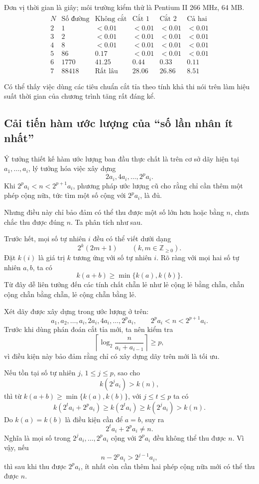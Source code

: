 \documentclass[11pt]{article}
\begin{document}
Đơn vị thời gian là giây; môi trường kiểm thử là Pentium II 266 MHz, 64 MB.
\[
\begin{array}{c|r|c|c|c|c}
N & \text{Số đường} & \text{Không cắt} & \text{Cắt 1} &
\text{Cắt 2} & \text{Cả hai}\\
\hline
2 & 1 & <0.01 & <0.01 & <0.01 & <0.01\\
3 & 2 & <0.01 & <0.01 & <0.01 & <0.01\\
4 & 8 & <0.01 & <0.01 & <0.01 & <0.01\\
5 & 86 & 0.17 & <0.01 & <0.01 & <0.01\\
6 & 1770 & 41.25 & 0.44 & 0.33 & 0.11\\
7 & 88418 & \text{Rất lâu} & 28.06 & 26.86 & 8.51
\end{array}
\]

Có thể thấy việc dùng các tiêu chuẩn cắt tỉa theo tính khả thi nói trên làm
hiệu suất thời gian của chương trình tăng rất đáng kể.

\subsection{Cải tiến hàm ước lượng của ``số lần nhân ít nhất''}

Ý tưởng thiết kế hàm ước lượng ban đầu thực chất là trên cơ sở dãy hiện tại
\(a_1,\ldots,a_i\), lý tưởng hóa việc xây dựng
\[
  2a_i,4a_i,\ldots,2^p a_i.
\]
Khi \(2^p a_i<n<2^{p+1}a_i\), phương pháp ước lượng cũ cho rằng chỉ cần thêm
một phép cộng nữa, tức tìm một số cộng với \(2^p a_i\), là đủ.

Nhưng điều này chỉ bảo đảm có thể thu được một số lớn hơn hoặc bằng \(n\),
chưa chắc thu được đúng \(n\). Ta phân tích như sau.

Trước hết, mọi số tự nhiên \(i\) đều có thể viết dưới dạng
\[
  2^k(2m+1)\qquad (k,m\in\mathbb{Z}_{\ge 0}).
\]
Đặt \(k(i)\) là giá trị \(k\) tương ứng với số tự nhiên \(i\). Rõ ràng với mọi
hai số tự nhiên \(a,b\), ta có
\[
  k(a+b)\ge \min\{k(a),k(b)\}.
\]
Từ đây dễ liên tưởng đến các tính chất chẵn lẻ như lẻ cộng lẻ bằng chẵn, chẵn
cộng chẵn bằng chẵn, lẻ cộng chẵn bằng lẻ.

Xét dãy được xây dựng trong ước lượng ở trên:
\[
  a_1,a_2,\ldots,a_i,2a_i,4a_i,\ldots,2^p a_i,
  \qquad 2^p a_i<n<2^{p+1}a_i.
\]
Trước khi dùng phán đoán cắt tỉa mới, ta nên kiểm tra
\[
  \left\lceil \log_2\frac{n}{a_i+a_{i-1}}\right\rceil \ge p,
\]
vì điều kiện này bảo đảm rằng chỉ có xây dựng dãy trên mới là tối ưu.

Nếu tồn tại số tự nhiên \(j\), \(1\le j\le p\), sao cho
\[
  k(2^j a_i)>k(n),
\]
thì từ \(k(a+b)\ge\min\{k(a),k(b)\}\), với \(j\le t\le p\) ta có
\[
  k(2^t a_i+2^p a_i)\ge k(2^t a_i)\ge k(2^j a_i)>k(n).
\]
Do \(k(a)=k(b)\) là điều kiện cần để \(a=b\), suy ra
\[
  2^t a_i+2^p a_i\ne n.
\]
Nghĩa là mọi số trong \(2^j a_i,\ldots,2^p a_i\) cộng với \(2^p a_i\) đều
không thể thu được \(n\). Vì vậy, nếu
\[
  n-2^p a_i > 2^{j-1}a_i,
\]
thì sau khi thu được \(2^p a_i\), ít nhất còn cần thêm hai phép cộng nữa mới
có thể thu được \(n\).
\end{document}
